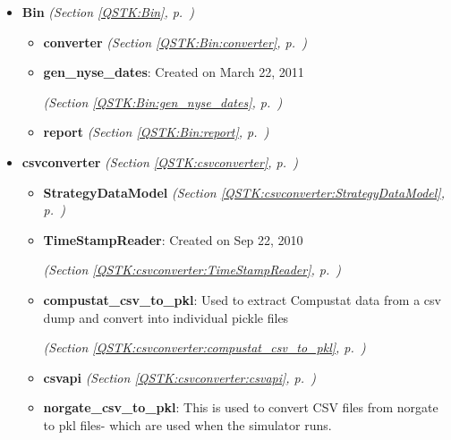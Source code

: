 \begin{itemize}
\setlength{\parskip}{0ex}
\item \textbf{Bin}
  \textit{(Section \ref{QSTK:Bin}, p.~\pageref{QSTK:Bin})}

  \begin{itemize}
\setlength{\parskip}{0ex}
    \item \textbf{converter}
  \textit{(Section \ref{QSTK:Bin:converter}, p.~\pageref{QSTK:Bin:converter})}

    \item \textbf{gen\_nyse\_dates}: Created on March 22, 2011



  \textit{(Section \ref{QSTK:Bin:gen_nyse_dates}, p.~\pageref{QSTK:Bin:gen_nyse_dates})}

    \item \textbf{report}
  \textit{(Section \ref{QSTK:Bin:report}, p.~\pageref{QSTK:Bin:report})}

  \end{itemize}
\item \textbf{csvconverter}
  \textit{(Section \ref{QSTK:csvconverter}, p.~\pageref{QSTK:csvconverter})}

  \begin{itemize}
\setlength{\parskip}{0ex}
    \item \textbf{StrategyDataModel}
  \textit{(Section \ref{QSTK:csvconverter:StrategyDataModel}, p.~\pageref{QSTK:csvconverter:StrategyDataModel})}

    \item \textbf{TimeStampReader}: Created on Sep 22, 2010



  \textit{(Section \ref{QSTK:csvconverter:TimeStampReader}, p.~\pageref{QSTK:csvconverter:TimeStampReader})}

    \item \textbf{compustat\_csv\_to\_pkl}: Used to extract Compustat data from a csv dump and convert into individual 
pickle files



  \textit{(Section \ref{QSTK:csvconverter:compustat_csv_to_pkl}, p.~\pageref{QSTK:csvconverter:compustat_csv_to_pkl})}

    \item \textbf{csvapi}
  \textit{(Section \ref{QSTK:csvconverter:csvapi}, p.~\pageref{QSTK:csvconverter:csvapi})}

    \item \textbf{norgate\_csv\_to\_pkl}: This is used to convert CSV files from norgate to pkl files- which are used
when the simulator runs.




\end{itemize}
\end{itemize}
